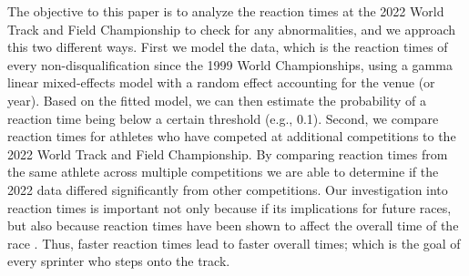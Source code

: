 \documentclass[12pt, letterpaper, titlepage]{article}
\newcommand{\eds}[1]{\textcolor{red}{EDS: (#1)}}
\newcommand{\of}[1]{\textcolor{violet}{OF: #1}}
\begin{document}
The objective to this paper is to analyze the reaction times at the 2022 World 
Track and Field Championship to check for any abnormalities, and we approach
this two different ways.  First we model the data, which is
the reaction times of every non-disqualification since the 1999 World 
Championships, using a gamma linear mixed-effects model with a random effect 
accounting for the venue (or year). 
Based on the fitted model, we can then estimate the probability of a reaction 
time being below a certain threshold (e.g., 0.1). 
Second, we compare reaction times for athletes who have competed
at additional competitions to the 2022 World Track and Field Championship.  By
comparing reaction times from the same athlete across multiple competitions we 
are able to determine if the 2022 data differed significantly from other 
competitions.
Our investigation into reaction times is important not only because if its
implications for future races, but also because reaction times have
been shown to affect the overall time of the race \citep{delalija2008reaction}.
Thus, faster reaction times lead to faster overall times; which is the goal of
every sprinter who steps onto the track.
\end{document}
